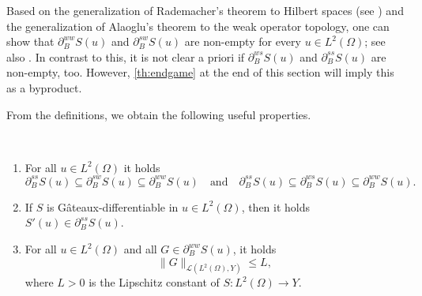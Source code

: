 \documentclass[reqno]{shinyart}
\begin{document}
\begin{remark}
    Based on the generalization of Rademacher's theorem to Hilbert spaces (see \cite{m76}) and 
    the generalization of Alaoglu's theorem to the weak operator topology, one can show
    that $\partial_B^{ww}S(u)$ and $\partial_B^{sw} S(u)$ are non-empty for every $u\in L^2(\Omega)$; 
    see also \cite{cg96}. In contrast to this, it is not clear a priori 
    if $\partial_B^{ws}S(u)$ and $\partial_B^{ss} S(u)$ are non-empty, too. 
    However, \cref{th:endgame} at the end of this section will imply this as a byproduct.
\end{remark}
From the definitions, we obtain the following useful properties.
\begin{lemma}\label{lem:boulibasic}\ 
    \begin{enumerate}[label=(\roman*)]
        \item\label{it:boulibasic1} For all $u \in L^2(\Omega)$ it holds
            \begin{equation*}
                \partial_{B}^{ss} S(u) \subseteq \partial_{B}^{sw} S(u)\subseteq \partial_{B}^{ww} S(u)
                \quad \text{and} \quad
                \partial_{B}^{ss} S(u) \subseteq \partial_{B}^{ws} S(u) \subseteq \partial_{B}^{ww} S(u).
            \end{equation*}
        \item\label{it:boulibasic2} If $S$ is G\^ateaux-differentiable in $u \in L^2(\Omega)$, then it holds
            $S'(u) \in \partial_{B}^{ss} S(u)$.
        \item\label{it:boulibasic3} For all $u \in L^2(\Omega)$ and all $G \in \partial_{B}^{ww} S(u)$, it holds
            \begin{equation*}
                \|G\|_{{\mathcal{L}}(L^2(\Omega), Y)} \leq L,
            \end{equation*}
            where $L>0$ is the Lipschitz constant of $S : L^2(\Omega) \to Y$.
    \end{enumerate}
\end{lemma}
\end{document}

